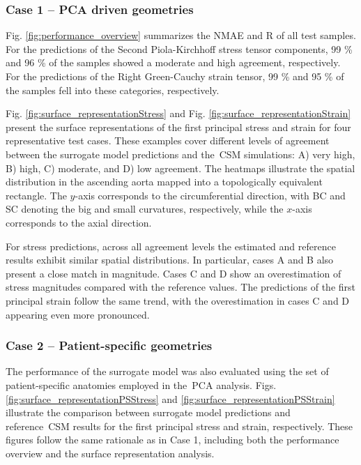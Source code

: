 \documentclass[a4paper,fleqn]{cas-sc}
\begin{document}
  \subsubsection{Case 1 -- PCA driven geometries}
    Fig. \ref{fig:performance_overview} summarizes the NMAE and R of all test samples. For the predictions of the Second Piola-Kirchhoff stress tensor components, 99 \% and 96 \% of the samples showed a moderate and high agreement, respectively. For the predictions of the Right Green-Cauchy strain tensor, 99 \% and 95 \% of the samples fell into these categories, respectively.

    Fig. \ref{fig:surface_representationStress} and Fig. \ref{fig:surface_representationStrain} present the surface representations of the first principal stress and strain for four representative test cases. These examples cover different levels of agreement between the surrogate model predictions and the~\gls{CSM} simulations: A) very high, B) high, C) moderate, and D) low agreement. The heatmaps illustrate the spatial distribution in the ascending aorta mapped into a topologically equivalent rectangle. The $y$-axis corresponds to the circumferential direction, with BC and SC denoting the big and small curvatures, respectively, while the $x$-axis corresponds to the axial direction.
     
    For stress predictions, across all agreement levels the estimated and reference results exhibit similar spatial distributions. In particular, cases A and B also present a close match in magnitude. Cases C and D show an overestimation of stress magnitudes compared with the reference values. The predictions of the first principal strain follow the same trend, with the overestimation in cases C and D appearing even more pronounced.

  \subsubsection{Case 2 -- Patient-specific geometries}
    The performance of the surrogate model was also evaluated using the set of patient-specific anatomies employed in the~\gls{PCA} analysis. Figs. \ref{fig:surface_representationPSStress} and \ref{fig:surface_representationPSStrain} illustrate the comparison between surrogate model predictions and reference~\gls{CSM} results for the first principal stress and strain, respectively. These figures follow the same rationale as in Case 1, including both the performance overview and the surface representation analysis. 
\end{document}
